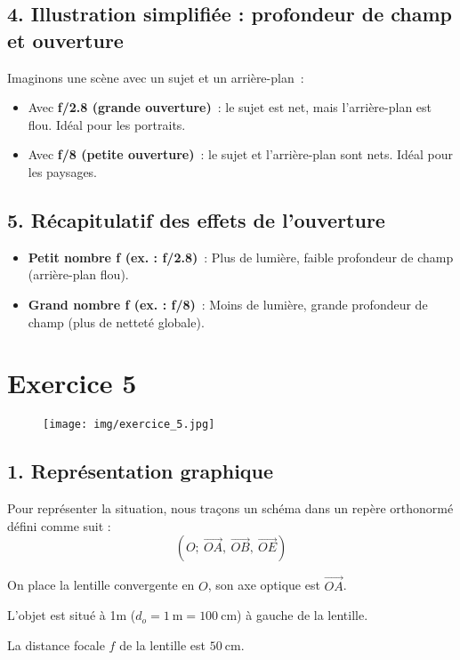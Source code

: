 \documentclass[answers]{exam}
\begin{document}
\subsection*{4. Illustration simplifiée : profondeur de champ et ouverture}

Imaginons une scène avec un sujet et un arrière-plan :

\begin{itemize}[noitemsep]
    \item Avec \textbf{f/2.8 (grande ouverture)} : le sujet est net, mais l'arrière-plan est flou. Idéal pour les portraits.
    \item Avec \textbf{f/8 (petite ouverture)} : le sujet et l'arrière-plan sont nets. Idéal pour les paysages.
\end{itemize}

\subsection*{5. Récapitulatif des effets de l'ouverture}

\begin{itemize}[noitemsep]
    \item \textbf{Petit nombre f (ex. : f/2.8)} : Plus de lumière, faible profondeur de champ (arrière-plan flou).
    \item \textbf{Grand nombre f (ex. : f/8)} : Moins de lumière, grande profondeur de champ (plus de netteté globale).
\end{itemize}


\section*{Exercice 5}

\begin{figure}[H]
  \centering
  \texttt{[image: img/exercice\_5.jpg]}
\end{figure}



\subsection*{1. Représentation graphique}

Pour représenter la situation, nous traçons un schéma dans un repère orthonormé défini comme suit :
\[
\left(O\mathpunct{} ; \ \overrightarrow{OA}\mathpunct{}, \ \overrightarrow{OB}\mathpunct{}, \ \overrightarrow{OE}\right)
\]
\begin{compactenum}
\item On place la lentille convergente en $O$, son axe optique est $\overrightarrow{OA}$.
\item L'objet est situé à 1m ($d_o = 1~\text{m} = 100~\text{cm}$) à gauche de la lentille.
\item La distance focale $f$ de la lentille est $50~\text{cm}$.
\end{compactenum}
\end{document}
